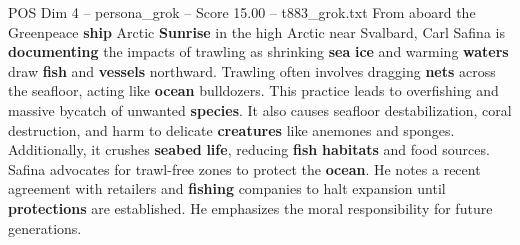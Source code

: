 \begin{textsample}{POS Dim 4 – persona\_grok – Score 15.00 – t883\_grok.txt}  \label{ex:f4_pos_037}
From aboard the Greenpeace \textbf{ship} Arctic \textbf{Sunrise} in the high Arctic near Svalbard, Carl Safina is \textbf{documenting} the impacts of trawling as shrinking \textbf{sea} \textbf{ice} and warming \textbf{waters} draw \textbf{fish} and \textbf{vessels} northward.
Trawling often involves dragging \textbf{nets} across the seafloor, acting like \textbf{ocean} bulldozers.
This practice leads to overfishing and massive bycatch of unwanted \textbf{species}.
It also causes seafloor destabilization, coral destruction, and harm to delicate \textbf{creatures} like anemones and sponges.
Additionally, it crushes \textbf{seabed} \textbf{life}, reducing \textbf{fish} \textbf{habitats} and food sources.
Safina advocates for trawl-free zones to protect the \textbf{ocean}.
He notes a recent agreement with retailers and \textbf{fishing} companies to halt expansion until \textbf{protections} are established.
He emphasizes the moral responsibility for future generations.

\end{textsample}

